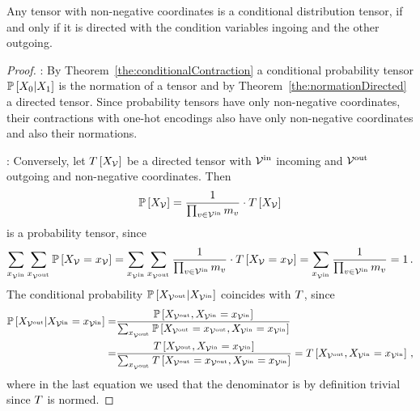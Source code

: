 \begin{theorem}\label{the:conditionalDirected}
	Any tensor with non-negative coordinates is a conditional distribution tensor, if and only if it is directed with the condition variables ingoing and the other outgoing.
\end{theorem}
\begin{proof}
	\proofrightsymbol:
	By Theorem~\ref{the:conditionalContraction} a conditional probability tensor $\mathbb{P}\left[X_{0}|X_{1}\right]$ is the normation of a tensor and by Theorem~\ref{the:normationDirected} a directed tensor.
	Since probability tensors have only non-negative coordinates, their contractions with one-hot encodings also have only non-negative coordinates and also their normations. 
	
	\proofleftsymbol:
	Conversely, let $T\left[X_{\mathcal{V}}\right]$ be a directed tensor with $\mathcal{V}^{\mathrm{in}}$ incoming and $\mathcal{V}^{\mathrm{out}}$ outgoing and non-negative coordinates.
	Then
	\begin{align}
		\mathbb{P}\left[X_{\mathcal{V}}\right] = \frac{1}{\prod_{v\in\mathcal{V}^{\mathrm{in}}}m_{v}} \cdot T\left[X_{\mathcal{V}}\right]
	\end{align}
	is a probability tensor, since 
	\begin{align*}
		\sum_{x_{\mathcal{V}^{\mathrm{in}}}} \sum_{x_{\mathcal{V}^{\mathrm{out}}}} \mathbb{P}\left[X_{\mathcal{V}}=x_{\mathcal{V}}\right] =
		\sum_{x_{\mathcal{V}^{\mathrm{in}}}} \sum_{x_{\mathcal{V}^{\mathrm{out}}}} \frac{1}{\prod_{v\in\mathcal{V}^{\mathrm{in}}}m_{v}} \cdot T\left[X_{\mathcal{V}}=x_{\mathcal{V}}\right] =
		\sum_{x_{\mathcal{V}^{\mathrm{in}}}} \frac{1}{\prod_{v\in\mathcal{V}^{\mathrm{in}}}m_{v}} = 1 \, . 
	\end{align*}
	The conditional probability $\mathbb{P}\left[X_{\mathcal{V}^{\mathrm{out}}}|X_{\mathcal{V}^{\mathrm{in}}}\right]$ coincides with $T$, since
	\begin{align*}
		\mathbb{P}\left[X_{\mathcal{V}^{\mathrm{out}}}|X_{\mathcal{V}^{\mathrm{in}}}=x_{\mathcal{V}^{\mathrm{in}}}\right] 
		=& \frac{
		\mathbb{P}\left[X_{\mathcal{V}^{\mathrm{out}}},X_{\mathcal{V}^{\mathrm{in}}}=x_{\mathcal{V}^{\mathrm{in}}}\right]
		}{
		\sum_{x_{\mathcal{V}^{\mathrm{out}}}} \mathbb{P}\left[X_{\mathcal{V}^{\mathrm{out}}}=x_{\mathcal{V}^{\mathrm{out}}},X_{\mathcal{V}^{\mathrm{in}}}=x_{\mathcal{V}^{\mathrm{in}}}\right]
		} \\
		=& \frac{
		T\left[X_{\mathcal{V}^{\mathrm{out}}},X_{\mathcal{V}^{\mathrm{in}}}=x_{\mathcal{V}^{\mathrm{in}}}\right]
		}{
		\sum_{x_{\mathcal{V}^{\mathrm{out}}}} T\left[X_{\mathcal{V}^{\mathrm{out}}}=x_{\mathcal{V}^{\mathrm{out}}},X_{\mathcal{V}^{\mathrm{in}}}=x_{\mathcal{V}^{\mathrm{in}}}\right]
		} 
		= T\left[X_{\mathcal{V}^{\mathrm{out}}},X_{\mathcal{V}^{\mathrm{in}}}=x_{\mathcal{V}^{\mathrm{in}}}\right] \, ,
	\end{align*}
	where in the last equation we used that the denominator is by definition trivial since $T$ is normed.
\end{proof}


